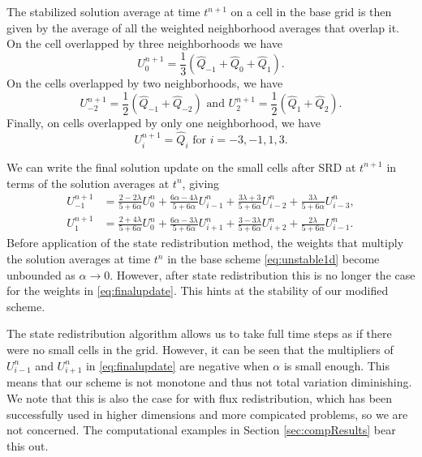 The stabilized solution average at time $t^{n+1}$ on a cell in the base grid is then 
given by the average of all the weighted neighborhood averages that overlap it.  
On the cell overlapped by three neighborhoods we have
\begin{equation} \label{eq:threeneigh}
U^{n+1}_{0} = \frac{1}{3}(\widehat{Q}_{-1}+\widehat{Q}_{0}+\widehat{Q}_{1}).
\end{equation}
On the  cells overlapped by two neighborhoods, we have
\begin{equation} \label{eq:twoneigh}
U^{n+1}_{-2} = \frac{1}{2}(\widehat{Q}_{-1}+\widehat{Q}_{-2}) \text{ and } U^{n+1}_{2} = \frac{1}{2}(\widehat{Q}_{1}+\widehat{Q}_{2}).
\end{equation}
Finally, on cells overlapped by only one neighborhood,  we have
\begin{equation} \label{eq:oneneigh}
	U^{n+1}_i = \widehat{Q}_i \text{ for } i = -3,-1,1,3.
\end{equation}

We can write the final solution update on the small cells after SRD  at $t^{n+1}$ in terms of the solution 
averages at $t^{n}$, giving
\begin{equation}
\begin{aligned}
U^{n+1}_{-1} &= \frac{2-2\lambda}{5+6\alpha}U^n_0 + \frac{6\alpha - 4 \lambda}{5+6\alpha}U^n_{i-1}+ \frac{3\lambda + 3}{5+6\alpha}U^n_{i-2}+\frac{3\lambda }{5+6\alpha}U^n_{i-3}, \\
U^{n+1}_{1} &= \frac{2+4\lambda}{5+6\alpha}U^n_0 + \frac{6\alpha - 3 \lambda}{5+6\alpha}U^n_{i+1}+ \frac{3-3\lambda}{5+6\alpha}U^n_{i+2}+\frac{2\lambda }{5+6\alpha}U^n_{i-1}.
\end{aligned} \label{eq:finalupdate}
\end{equation}
Before application of the state redistribution method, the weights that multiply the solution averages at time $t^n$ in the base scheme \eqref{eq:unstable1d} become unbounded as $\alpha \rightarrow 0$.
However, after state redistribution this is no longer the case for the weights 
in \eqref{eq:finalupdate}.  This hints at the stability of our modified scheme.  

The state redistribution algorithm allows us to take full time steps as if there were no 
small cells in the grid.  However, it can be seen that the multipliers of $U^n_{i-1}$ and $U^n_{i+1}$ 
in \eqref{eq:finalupdate} are negative when $\alpha$ is small enough.  This means that our scheme is not 
monotone and thus not total variation diminishing.  We note that this is also the case for 
with flux redistribution, which has been successfully used in higher dimensions and more
compicated problems, 
so we are not concerned.
The computational examples in Section \ref{sec:compResults} bear this out.  

